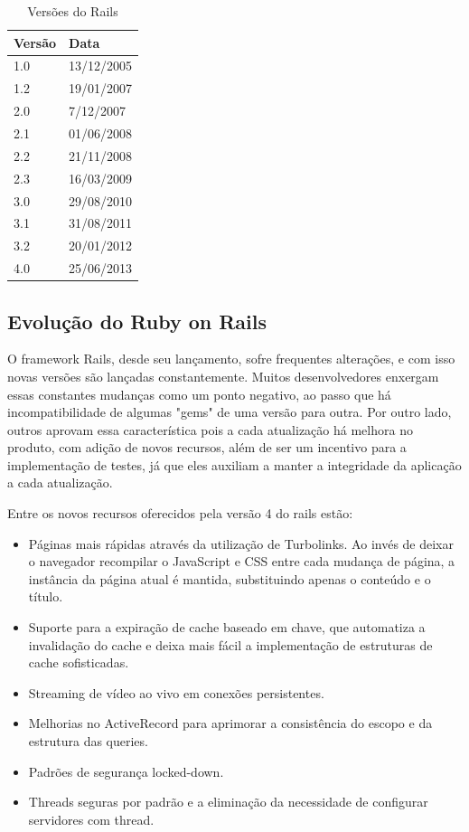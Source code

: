 \begin{table}[H]
\begin{center}
    \begin{tabular}{ | l | l |}
    \hline
    Versão & Data \\ \hline
    1.0 & 13/12/2005 \\ \hline
    1.2 & 19/01/2007 \\ \hline
    2.0 & 7/12/2007 \\ \hline
    2.1 & 01/06/2008 \\ \hline
    2.2 & 21/11/2008 \\ \hline
    2.3 & 16/03/2009 \\ \hline
    3.0 & 29/08/2010 \\ \hline
    3.1 & 31/08/2011 \\ \hline
    3.2 & 20/01/2012 \\ \hline
    4.0 & 25/06/2013 \\ \hline
    \end{tabular}
    \caption{Versões do Rails}
    \label{rails_versions}
\end{center}
\end{table}


\subsection{Evolução do Ruby on Rails}

O framework Rails, desde seu lançamento, sofre frequentes alterações, e com isso novas versões são lançadas constantemente. Muitos desenvolvedores enxergam essas constantes mudanças como um ponto negativo, ao passo que há incompatibilidade de algumas "gems" de uma versão para outra. Por outro lado, outros aprovam essa característica pois a cada atualização há melhora no produto, com adição de novos recursos, além de ser um incentivo para a implementação de testes, já que eles auxiliam a manter a integridade da aplicação a cada atualização.


Entre os novos recursos oferecidos pela versão 4 do rails estão:
\begin{itemize}
\item Páginas mais rápidas através da utilização de Turbolinks. Ao invés de deixar o navegador recompilar o JavaScript e CSS entre cada mudança de página, a instância da página atual é mantida, substituindo apenas o conteúdo e o título.
\item Suporte para a expiração de cache baseado em chave, que automatiza a invalidação do cache e deixa mais fácil a implementação de estruturas de cache sofisticadas.
\item Streaming de vídeo ao vivo em conexões persistentes.
\item Melhorias no ActiveRecord para aprimorar a consistência do escopo e da estrutura das queries.
\item Padrões de segurança locked-down.
\item Threads seguras por padrão e a eliminação da necessidade de configurar servidores com thread.
\end{itemize}


